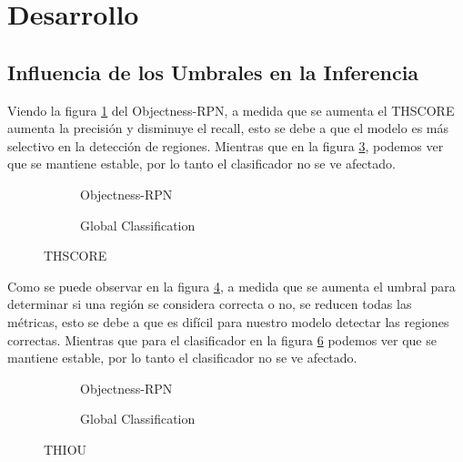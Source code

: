 \section{Desarrollo}


\subsection{Influencia de los Umbrales en la Inferencia}
Viendo la figura \ref{fig:objectness_TH_SCORE} del Objectness-RPN, a medida que se aumenta el TH\textunderscore SCORE aumenta la precisión y disminuye el recall, esto se debe a que el modelo es más selectivo en la detección de regiones. Mientras que en la figura \ref{fig:global_TH_SCORE}, podemos ver que se mantiene estable, por lo tanto el clasificador no se ve afectado.

\begin{figure}[h]
  \centering
  \begin{subfigure}[t]{.5\textwidth}
    
    \caption{Objectness-RPN}
    \label{fig:objectness_TH_SCORE}
  \end{subfigure}%
  \begin{subfigure}[t]{.5\textwidth}
    
    \caption{Global Classification}
    \label{fig:global_TH_SCORE}
  \end{subfigure}
  \caption{TH\textunderscore SCORE}
\end{figure}

Como se puede observar en la figura \ref{fig:objectness_TH_IOU}, a medida que se aumenta el umbral para determinar si una región se considera correcta o no, se reducen todas las métricas, esto se debe a que es difícil para nuestro modelo detectar las regiones correctas. Mientras que para el clasificador en la figura \ref{fig:global_TH_IOU} podemos ver que se mantiene estable, por lo tanto el clasificador no se ve afectado.

\begin{figure}[h]
  \centering
  \begin{subfigure}[t]{.5\textwidth}
    
    \caption{Objectness-RPN}
    \label{fig:objectness_TH_IOU}
  \end{subfigure}%
  \begin{subfigure}[t]{.5\textwidth}
    \centering
    
    \caption{Global Classification}
    \label{fig:global_TH_IOU}
  \end{subfigure}
  \caption{TH\textunderscore IOU}
\end{figure}



